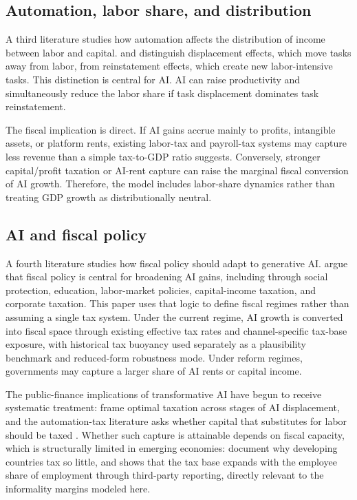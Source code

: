 \documentclass[11pt,a4paper]{article}
\begin{document}
\subsection{Automation, labor share, and distribution}

A third literature studies how automation affects the distribution of income between labor and capital. \citet{acemoglu2018race} and \citet{acemoglu2019automation} distinguish displacement effects, which move tasks away from labor, from reinstatement effects, which create new labor-intensive tasks. This distinction is central for AI. AI can raise productivity and simultaneously reduce the labor share if task displacement dominates task reinstatement.

The fiscal implication is direct. If AI gains accrue mainly to profits, intangible assets, or platform rents, existing labor-tax and payroll-tax systems may capture less revenue than a simple tax-to-GDP ratio suggests. Conversely, stronger capital/profit taxation or AI-rent capture can raise the marginal fiscal conversion of AI growth. Therefore, the model includes labor-share dynamics rather than treating GDP growth as distributionally neutral.

\subsection{AI and fiscal policy}

A fourth literature studies how fiscal policy should adapt to generative AI. \citet{brollo2024fiscal} argue that fiscal policy is central for broadening AI gains, including through social protection, education, labor-market policies, capital-income taxation, and corporate taxation. This paper uses that logic to define fiscal regimes rather than assuming a single tax system. Under the current regime, AI growth is converted into fiscal space through existing effective tax rates and channel-specific tax-base exposure, with historical tax buoyancy used separately as a plausibility benchmark and reduced-form robustness mode. Under reform regimes, governments may capture a larger share of AI rents or capital income.

The public-finance implications of transformative AI have begun to receive systematic
treatment: \citet{korinek2026public} frame optimal taxation across stages of AI displacement,
and the automation-tax literature asks whether capital that substitutes for labor should be
taxed \citep{guerreiro2022robots}. Whether such capture is attainable depends on fiscal
capacity, which is structurally limited in emerging economies: \citet{besley2014taxation}
document why developing countries tax so little, and \citet{jensen2022employment} shows that the
tax base expands with the employee share of employment through third-party reporting, directly
relevant to the informality margins modeled here.
\end{document}
